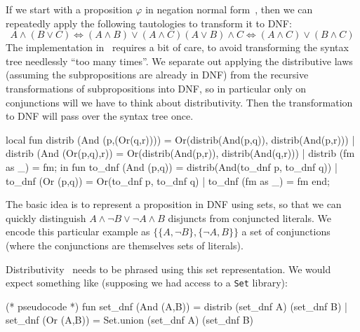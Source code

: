 \begin{node}
\begin{definition}
\begin{node}\label{prop:normal-form-0006}%
If we start with a proposition $\varphi$ in negation normal
form~, then we can repeatedly apply the following
tautologies to transform it to DNF:
\begin{subequations}
\begin{equation}
A\land (B\lor C)\iff (A\land B)\lor(A\land C)
\end{equation}
\begin{equation}
(A\lor B)\land C\iff (A\land C)\lor(B\land C)
\end{equation}
\end{subequations}
The implementation in \SML\ requires a bit of care, to avoid
transforming the syntax tree needlessly ``too many times''. We separate
out applying the distributive laws (assuming the subpropositions are
already in DNF) from the recursive transformations of subpropositions
into DNF, so in particular only on conjunctions will we have to think
about distributivity. Then the transformation to DNF will pass over the
syntax tree once.
\begin{sml}
local
  fun distrib (And (p,(Or(q,r)))) = Or(distrib(And(p,q)), distrib(And(p,r)))
   |  distrib (And (Or(p,q),r)) = Or(distrib(And(p,r)), distrib(And(q,r)))
   |  distrib (fm as _) = fm;
in
  fun to_dnf (And (p,q)) = distrib(And(to_dnf p, to_dnf q))
   |  to_dnf (Or (p,q)) = Or(to_dnf p, to_dnf q)
   |  to_dnf (fm as _) = fm
end;
\end{sml}
\end{node}
\begin{node}\label{prop:normal-form-0007}%
\begin{node}\label{prop:normal-form-0008}%
The basic idea is to represent a proposition in DNF using sets, so that
we can quickly distinguish $A\land\neg B\lor\neg A\land B$ disjuncts
from conjuncted literals. We encode this particular example as
$\{\{A,\neg B\},\{\neg A,B\}\}$
a set of conjunctions (where the conjunctions are themselves sets of
literals). 
\end{node}
\begin{node}\label{prop:normal-form-0009}%
Distributivity~ needs to be phrased using
this set representation. We would expect something like (supposing we
had access to a \verb|Set| library):
\begin{sml}
(* pseudocode *)
fun set_dnf (And (A,B)) = distrib (set_dnf A) (set_dnf B)
 |  set_dnf (Or (A,B)) = Set.union (set_dnf A) (set_dnf B)

\end{sml}
\end{node}
\end{node}
\end{definition}
\end{node}
